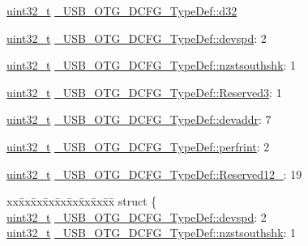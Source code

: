 \begin{DoxyCompactItemize}
\begin{tabbing}
\end{tabbing}\item 
\hyperlink{stdint_8h_a435d1572bf3f880d55459d9805097f62}{uint32\-\_\-t} \hyperlink{group___u_s_b___o_t_g___d_r_i_v_e_r_ga9fdcd91e0a212a4b3e195b67d79b033b}{\-\_\-\-U\-S\-B\-\_\-\-O\-T\-G\-\_\-\-D\-C\-F\-G\-\_\-\-Type\-Def\-::d32}
\item 
\hyperlink{stdint_8h_a435d1572bf3f880d55459d9805097f62}{uint32\-\_\-t} \hyperlink{group___u_s_b___o_t_g___d_r_i_v_e_r_ga478a9ce31a39e38fb2af42c4cd76916c}{\-\_\-\-U\-S\-B\-\_\-\-O\-T\-G\-\_\-\-D\-C\-F\-G\-\_\-\-Type\-Def\-::devspd}\-: 2
\item 
\hyperlink{stdint_8h_a435d1572bf3f880d55459d9805097f62}{uint32\-\_\-t} \hyperlink{group___u_s_b___o_t_g___d_r_i_v_e_r_ga7fd4cbb8c5ed0671b331e75c3b6d45ae}{\-\_\-\-U\-S\-B\-\_\-\-O\-T\-G\-\_\-\-D\-C\-F\-G\-\_\-\-Type\-Def\-::nzstsouthshk}\-: 1
\item 
\hyperlink{stdint_8h_a435d1572bf3f880d55459d9805097f62}{uint32\-\_\-t} \hyperlink{group___u_s_b___o_t_g___d_r_i_v_e_r_ga96e0a6f3a74c064c783938a70f6c1cc4}{\-\_\-\-U\-S\-B\-\_\-\-O\-T\-G\-\_\-\-D\-C\-F\-G\-\_\-\-Type\-Def\-::\-Reserved3}\-: 1
\item 
\hyperlink{stdint_8h_a435d1572bf3f880d55459d9805097f62}{uint32\-\_\-t} \hyperlink{group___u_s_b___o_t_g___d_r_i_v_e_r_ga480afca18ff15a505a2aacace2f86879}{\-\_\-\-U\-S\-B\-\_\-\-O\-T\-G\-\_\-\-D\-C\-F\-G\-\_\-\-Type\-Def\-::devaddr}\-: 7
\item 
\hyperlink{stdint_8h_a435d1572bf3f880d55459d9805097f62}{uint32\-\_\-t} \hyperlink{group___u_s_b___o_t_g___d_r_i_v_e_r_ga9457374dd209907da9cd87735a0db113}{\-\_\-\-U\-S\-B\-\_\-\-O\-T\-G\-\_\-\-D\-C\-F\-G\-\_\-\-Type\-Def\-::perfrint}\-: 2
\item 
\hyperlink{stdint_8h_a435d1572bf3f880d55459d9805097f62}{uint32\-\_\-t} \hyperlink{group___u_s_b___o_t_g___d_r_i_v_e_r_gad5cb5b9ebd9097c836ab8bfc22cafb09}{\-\_\-\-U\-S\-B\-\_\-\-O\-T\-G\-\_\-\-D\-C\-F\-G\-\_\-\-Type\-Def\-::\-Reserved12\-\_}\-: 19
\item 
\begin{tabbing}
xx\=xx\=xx\=xx\=xx\=xx\=xx\=xx\=xx\=\kill
struct \{\\
\>\hyperlink{stdint_8h_a435d1572bf3f880d55459d9805097f62}{uint32\_t} \hyperlink{group___u_s_b___o_t_g___d_r_i_v_e_r_ga478a9ce31a39e38fb2af42c4cd76916c}{\_USB\_OTG\_DCFG\_TypeDef::devspd}: 2\\
\>\hyperlink{stdint_8h_a435d1572bf3f880d55459d9805097f62}{uint32\_t} \hyperlink{group___u_s_b___o_t_g___d_r_i_v_e_r_ga7fd4cbb8c5ed0671b331e75c3b6d45ae}{\_USB\_OTG\_DCFG\_TypeDef::nzstsouthshk}: 1\\

\end{tabbing}
\end{DoxyCompactItemize}
